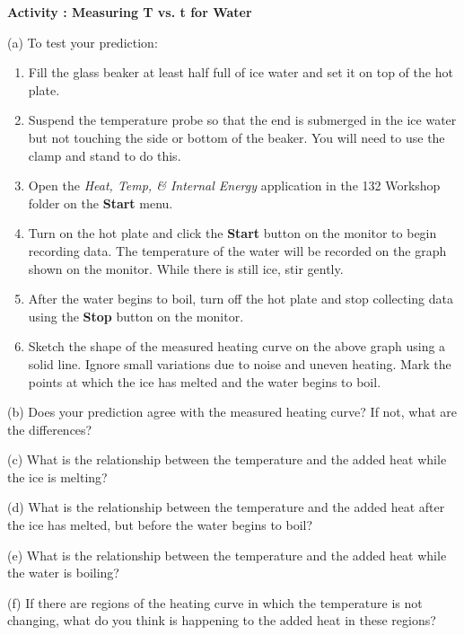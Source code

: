 \textbf{Activity : Measuring T vs. t for Water} 

(a) To test your prediction: 

\begin{enumerate}
\item Fill the glass beaker at least half full of ice water and set it on 
top of the hot plate.
\item Suspend the temperature probe so that the end is submerged in the ice 
water but not touching the side or bottom of the beaker. 
You will need to use the clamp and stand to do this.
\item Open the \textit{Heat, Temp, \& Internal Energy} application in the
132 Workshop folder on the {\bf Start} menu.
\item Turn on the hot plate and click the
\textbf{Start} button on the monitor to begin recording data. 
The temperature of the water will be recorded on the graph shown on the monitor. 
While there is still ice, stir gently. 
\item After the water begins to boil, turn off the hot plate and stop collecting 
data using the \textbf{Stop} button on the monitor. 
\item Sketch the shape of the measured heating curve on the above graph
using a solid line. Ignore small variations due to noise and uneven
heating. Mark the points at which the ice has melted and the water
begins to boil.
\end{enumerate}
(b) Does your prediction agree with the measured heating curve? If
not, what are the differences?
\vspace{20mm}

(c) What is the relationship between the temperature and the added
heat while the ice is melting?
\vspace{20mm}

(d) What is the relationship between the temperature and the added
heat after the ice has melted, but before the water begins to boil?
\vspace{20mm}

(e) What is the relationship between the temperature and the added
heat while the water is boiling?
\vspace{20mm}

(f) If there are regions of the heating curve in which the temperature
is not changing, what do you think is happening to the added heat
in these regions?\vspace{20mm}


